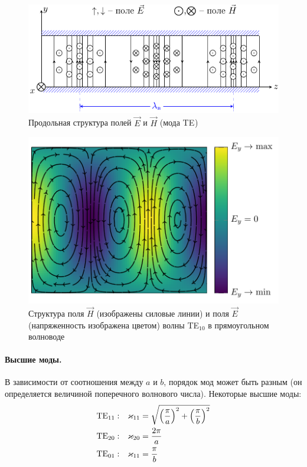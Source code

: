 \begin{figure}[H]
	\centering
	\includegraphics[width=\textwidth]{img/lect4_ris10}
	\caption{Продольная структура полей $\vec{E}$ и $\vec{H}$ (мода TE$_{}$)}
	\label{fig:lect4:10}
\end{figure}

\begin{figure}[H]
	\centering
	\includegraphics[scale=1]{img/lect4_ris11}
	\caption{Структура поля $\vec{H}$ (изображены силовые линии) и поля $\vec{E}$ (напряженность изображена цветом) волны TE$_{10}$ в прямоугольном волноводе}
	\label{fig:lect4:11}
\end{figure}

\paragraph{Высшие моды.} В зависимости от соотношения между $a$ и $b$, порядок мод может быть разным (он определяется величиной поперечного волнового числа). Некоторые высшие моды:
\begin{equation}
\begin{aligned}
 		\text{TE}_{11}:& \quad  \varkappa_{11}=\sqrt{\qty(\frac{\pi}{a})^2+\qty(\frac{\pi}{b})^2}\\
 		\text{TE}_{20}:& \quad  \varkappa_{20}=\frac{2\pi}{a} \\
 		\text{TE}_{01}:& \quad  \varkappa_{11}=\frac{\pi}{b}
\end{aligned} 	
\end{equation} 

